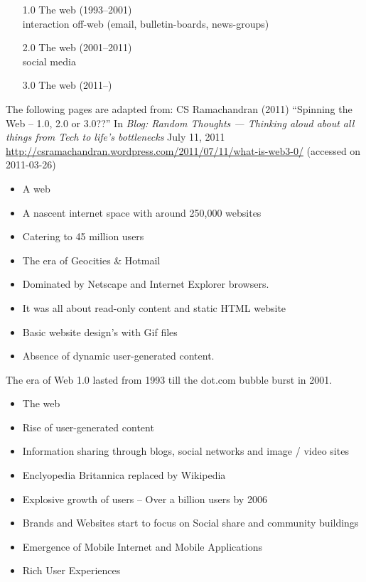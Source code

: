 \documentclass[a4paper,landscape,headrule,footrule,xetex]{foils}
\begin{document}

\begin{itemize}
\item[1.0] The  web (1993--2001) 
  \\ interaction off-web (email, bulletin-boards, news-groups)
\item[2.0] The  web (2001--2011) 
 \\ social media
\item[3.0] The  web (2011--) 
\end{itemize}

The following pages are adapted from: CS Ramachandran (2011) ``Spinning the Web – 1.0, 2.0 or 3.0??''
In \textit{Blog:  Random Thoughts --- Thinking aloud about all things from Tech to life's bottlenecks}
July 11, 2011 \url{http://csramachandran.wordpress.com/2011/07/11/what-is-web3-0/} (accessed on 2011-03-26)

\MyLogo{}
\begin{itemize} \addtolength{\itemsep}{-1.25ex}
\item  A  web
\item  A nascent internet space with around 250,000 websites
\item  Catering to 45 million users
\item  The era of Geocities \& Hotmail
\item  Dominated by Netscape and Internet Explorer browsers.
\item  It was all about read-only content and static HTML website
\item  Basic website design’s with Gif files
\item  Absence of dynamic user-generated content.
\end{itemize}

The era of Web 1.0 lasted from 1993 till the dot.com bubble burst in 2001.

\begin{itemize} \addtolength{\itemsep}{-1.25ex}
\item  The  web
\item  Rise of user-generated content
\item  Information sharing through blogs, social networks and image / video sites
\item  Enclyopedia Britannica replaced by Wikipedia
\item  Explosive growth of users – Over a billion users by 2006
\item  Brands and Websites start to focus on Social share and community buildings
\item  Emergence of Mobile Internet and Mobile Applications
\item  Rich User Experiences
\end{itemize}
\end{document}

